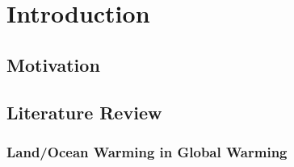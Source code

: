 \chapter{Introduction} %

\label{introduction} %



\section{Motivation}

\section{Literature Review}

\subsection{Land/Ocean Warming in Global Warming}

